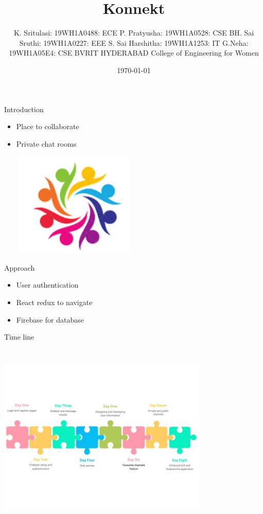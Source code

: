 \documentclass[14pt]{beamer}
\title{Konnekt}
\author[]{K. Sritulasi: 19WH1A0488: ECE \vspace*{0.1cm} \newline P. Pratyusha: 19WH1A0528: CSE  \vspace*{0.1cm} \newline BH. Sai Sruthi: 19WH1A0227: EEE \vspace*{0.1cm} \newline S. Sai Harshitha: 19WH1A1253: IT \vspace*{0.1cm}\newline G.Neha: 19WH1A05E4: CSE \vspace*{0.1cm} \newline \vspace*{0.2cm} \small {\newline BVRIT HYDERABAD College of Engineering for Women}}
\date{\today}
\begin{document}
\begin{frame}
	\titlepage
\end{frame}

\begin{frame}{Introduction}
\begin{itemize}
	\item Place to collaborate
	\item Private chat rooms
		\begin{center}
			\includegraphics[height=5cm, width=6cm]{konnect_logo.png}
		\end{center}

	\end{itemize}
\end{frame}

\begin{frame}{Approach}
		\begin{itemize}
			\item User authentication
			\item React redux to navigate
			\item Firebase for database
		\end{itemize}
\end{frame}

\begin{frame}{Time line}
\begin{itemize}
		\begin{center}
			\includegraphics[height=9cm, width=10cm]{Timelinenew.jpeg}
		\end{center}
	\end{itemize}
\end{frame}
\end{document}
